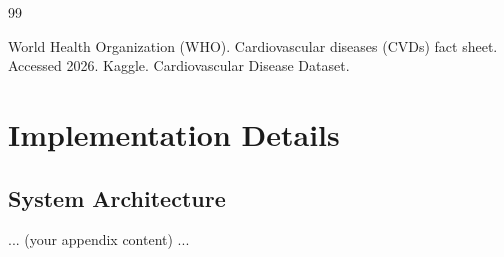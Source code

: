 \documentclass[12pt, a4paper, oneside]{book}
\begin{document}
\clearpage
{}
\renewcommand{\bibname}{References}
\begin{thebibliography}{99}
\setlength{\itemsep}{0.25em}
 World Health Organization (WHO). Cardiovascular diseases (CVDs) fact sheet. Accessed 2026.
 Kaggle. Cardiovascular Disease Dataset.
\end{thebibliography}

\appendix
\chapter{Implementation Details}
\section{System Architecture}
... (your appendix content) ...
\end{document}
